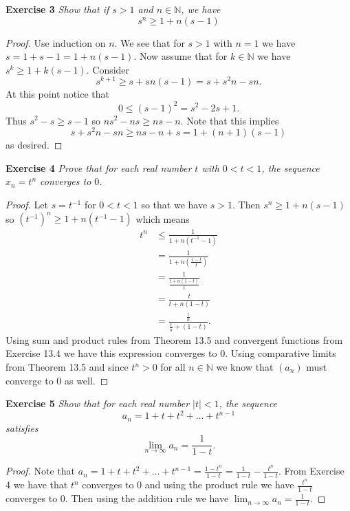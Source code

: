 \documentclass{article}
\begin{document}
\begin{flushleft}
\textbf{Exercise 3}
\textsl{Show that if $s>1$ and $n \in \mathbb{N}$, we have
\[
s^n \geq 1+n(s-1)
\]}
\begin{proof}
Use induction on $n$. We see that for $s>1$ with $n=1$ we have $s = 1+s-1=1+n(s-1)$. Now assume that for $k \in \mathbb{N}$ we have $s^k \geq 1+k(s-1)$. Consider
\[
s^{k+1} \geq s + sn(s-1) = s + s^2n - sn.
\]
At this point notice that
\[
0 \leq (s-1)^2 = s^2 - 2s + 1.
\]
Thus $s^2 - s \geq s - 1$ so $ns^2 - ns \geq ns - n$. Note that this implies
\[
s + s^2n - sn \geq ns - n + s = 1 + (n+1)(s-1)
\]
as desired.
\end{proof}

\textbf{Exercise 4}
\textsl{Prove that for each real number $t$ with $0<t<1$, the sequence $x_n=t^n$ converges to $0$.}
\begin{proof}
Let $s=t^{-1}$ for $0<t<1$ so that we have $s>1$. Then $s^n \geq 1+n(s-1)$ so $(t^{-1})^n \geq 1 + n(t^{-1} -1)$ which means
\begin{align*}
t^n & \leq \frac{1}{1+n(t^{-1} - 1)} \\
    & = \frac{1}{1+n(\frac{1-t}{t})} \\
    & = \frac{1}{\frac{t+n(1-t)}{t}} \\
    & = \frac{t}{t+n(1-t)} \\
    & = \frac{\frac{t}{n}}{\frac{t}{n} + (1-t)}.
\end{align*}
Using sum and product rules from Theorem 13.5 and convergent functions from Exercise 13.4 we have this expression converges to $0$. Using comparative limits from Theorem 13.5 and since $t^n > 0$ for all $n \in \mathbb{N}$ we know that $(a_n)$ must converge to $0$ as well.
\end{proof}

\textbf{Exercise 5}
\textsl{Show that for each real number $|t| < 1$, the sequence
\[
a_n = 1 + t + t^2 + \dots + t^{n-1}
\]
satisfies
\[
\lim_{n \rightarrow \infty} a_n = \frac{1}{1-t}.
\]}
\begin{proof}
Note that $a_n=1+t+t^2+ \dots +t^{n-1}=\frac{1-t^n}{1-t}=\frac{1}{1-t} - \frac{t^n}{1-t}$. From Exercise 4 we have that $t^n$ converges to $0$ and using the product rule we have $\frac{t^n}{1-t}$ converges to $0$. Then using the addition rule we have $\lim_{n \rightarrow \infty} a_n = \frac{1}{1-t}$.
\end{proof}


\end{flushleft}
\end{document}
